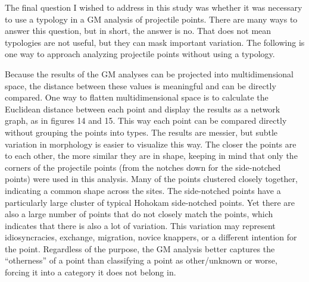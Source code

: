 \documentclass{article}
\begin{document}
The final question I wished to address in this study was whether it was
necessary to use a typology in a GM analysis of projectile points. There
are many ways to answer this question, but in short, the answer is no.
That does not mean typologies are not useful, but they can mask
important variation. The following is one way to approach analyzing
projectile points without using a typology.

Because the results of the GM analyses can be projected into
multidimensional space, the distance between these values is meaningful
and can be directly compared. One way to flatten multidimensional space
is to calculate the Euclidean distance between each point and display
the results as a network graph, as in figures 14 and 15. This way each
point can be compared directly without grouping the points into types.
The results are messier, but subtle variation in morphology is easier to
visualize this way. The closer the points are to each other, the more
similar they are in shape, keeping in mind that only the corners of the
projectile points (from the notches down for the side-notched points)
were used in this analysis. Many of the points clustered closely
together, indicating a common shape across the sites. The side-notched
points have a particularly large cluster of typical Hohokam side-notched
points. Yet there are also a large number of points that do not closely
match the points, which indicates that there is also a lot of variation.
This variation may represent idiosyncracies, exchange, migration, novice
knappers, or a different intention for the point. Regardless of the
purpose, the GM analysis better captures the ``otherness'' of a point
than classifying a point as other/unknown or worse, forcing it into a
category it does not belong in.
\end{document}
